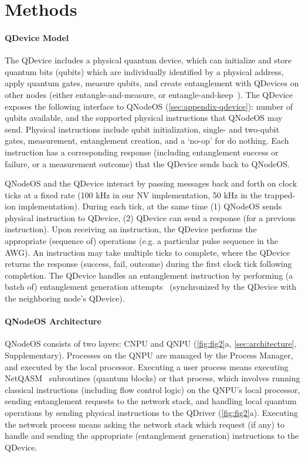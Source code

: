 \section{Methods}
\label{sec:methods}

\paragraph{QDevice Model}

The QDevice includes a physical quantum device, which can initialize and store quantum bits (qubits) which are individually identified by a physical address, apply quantum gates, measure qubits, and create entanglement with QDevices on other nodes (either entangle-and-measure, or entangle-and-keep~\cite{dahlberg_2019_egp}). The QDevice exposes the following interface to QNodeOS (\cref{sec:appendix-qdevice}): number of qubits available, and the supported physical instructions that QNodeOS may send. Physical instructions include qubit initialization, single- and two-qubit gates, measurement, entanglement creation, and a `no-op' for do nothing. Each instruction has a corresponding response (including entanglement success or failure, or a measurement outcome) that the QDevice sends back to QNodeOS.

QNodeOS and the QDevice interact by passing messages back and forth on clock ticks at a fixed rate (100 kHz in our NV implementation, 50 kHz in the trapped-ion implementation). During each tick, at the same time (1) QNodeOS sends physical instruction to QDevice, (2) QDevice can send a response (for a previous instruction). Upon receiving an instruction, the QDevice performs the appropriate (sequence of) operations (e.g. a particular pulse sequence in the AWG). An instruction may take multiple ticks to complete, where the QDevice returns the response (success, fail, outcome) during the first clock tick following completion. The QDevice handles an entanglement instruction by performing (a batch of) entanglement generation attempts~\cite{pompili_2022_experimental} (synchronized by the QDevice with the neighboring node's QDevice). 

\paragraph{QNodeOS Architecture}

QNodeOS consists of two layers: CNPU and QNPU (\cref{fig:fig2}a, \cref{sec:architecture}, Supplementary). Processes on the QNPU are managed by the Process Manager, and executed by the local processor. Executing a user process means executing NetQASM~\cite{dahlberg_2022_netqasm} subroutines (quantum blocks) or that process, which involves running classical instructions (including flow control logic) on the QNPU's local processor, sending entanglement requests to the network stack, and handling local quantum operations by sending physical instructions to the QDriver (\cref{fig:fig2}a). Executing the network process means asking the network stack which request (if any) to handle and sending the appropriate (entanglement generation) instructions to the QDevice. 

